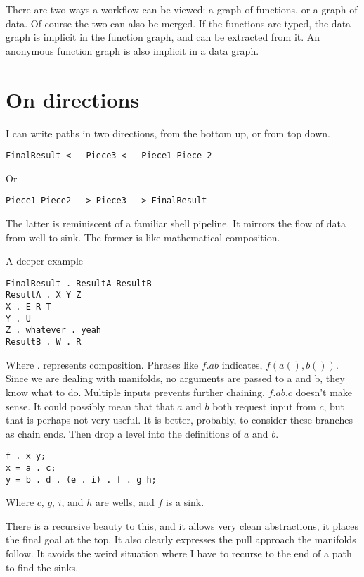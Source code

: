 \documentclass[12pt]{article}
\begin{document}
There are two ways a workflow can be viewed: a graph of functions, or a graph
of data. Of course the two can also be merged. If the functions are typed, the
data graph is implicit in the function graph, and can be extracted from it. An
anonymous function graph is also implicit in a data graph.

\section{On directions}

I can write paths in two directions, from the bottom up, or from top down.

\begin{verbatim}
FinalResult <-- Piece3 <-- Piece1 Piece 2
\end{verbatim}

Or

\begin{verbatim}
Piece1 Piece2 --> Piece3 --> FinalResult
\end{verbatim}

The latter is reminiscent of a familiar shell pipeline. It mirrors the flow of
data from well to sink. The former is like mathematical composition.

A deeper example

\begin{verbatim}
FinalResult . ResultA ResultB
ResultA . X Y Z
X . E R T
Y . U
Z . whatever . yeah
ResultB . W . R
\end{verbatim}

Where $.$ represents composition. Phrases like $f . a b$ indicates,
$f(a(),b())$. Since we are dealing with manifolds, no arguments are passed to
a and b, they know what to do. Multiple inputs prevents further chaining. $f . a b . c$ doesn't make sense. It could possibly mean that that $a$ and $b$
both request input from $c$, but that is perhaps not very useful. It is better,
probably, to consider these branches as chain ends. Then drop a level into the
definitions of $a$ and $b$.

\begin{verbatim}
f . x y;
x = a . c;
y = b . d . (e . i) . f . g h;
\end{verbatim}

Where $c$, $g$, $i$, and $h$ are wells, and $f$ is a sink.

There is a recursive beauty to this, and it allows very clean abstractions, it
places the final goal at the top. It also clearly expresses the pull approach
the manifolds follow. It avoids the weird situation where I have to recurse to
the end of a path to find the sinks.
\end{document}
